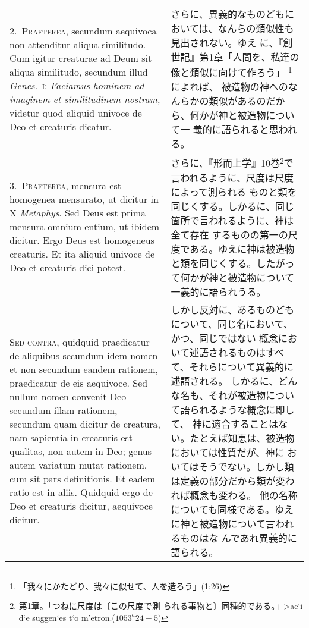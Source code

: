 \documentclass[paper=a4paper,fontsize=10pt,jafontsize=9pt,titlepage]{jlreq}
\begin{document}
\begin{longtable}{p{21em}p{21em}}
\\

2.~{\scshape Praeterea}, secundum aequivoca non attenditur aliqua
similitudo. Cum igitur creaturae ad Deum sit aliqua similitudo,
secundum illud {\itshape Genes}.\ {\scshape i}: {\itshape Faciamus hominem ad
imaginem et similitudinem nostram}, videtur quod aliquid univoce de
Deo et creaturis dicatur.

&

さらに、異義的なものどもにおいては、なんらの類似性も見出されない。ゆえ
に、『創世記』第1章「人間を、私達の像と類似に向けて作ろう」
\footnote{「我々にかたどり、我々に似せて、人を造ろう」(1:26)}によれば、
被造物の神へのなんらかの類似があるのだから、何かが神と被造物について一
義的に語られると思われる。

\\

3.~{\scshape Praeterea}, mensura est homogenea mensurato, ut dicitur in X
{\itshape Metaphys}. Sed Deus est prima mensura omnium entium, ut ibidem
dicitur. Ergo Deus est homogeneus creaturis. Et ita aliquid univoce de
Deo et creaturis dici potest.

&

さらに、『形而上学』10巻\footnote{第1章。「つねに尺度は〔この尺度で測
られる事物と〕同種的である。」\textgreek{>ae`i d`e suggen`es t`o
m'etron.}($1053^{a}24-5$)}で言われるように、尺度は尺度によって測られる
ものと類を同じくする。しかるに、同じ箇所で言われるように、神は全て存在
するものの第一の尺度である。ゆえに神は被造物と類を同じくする。したがっ
て何かが神と被造物について一義的に語られうる。

\\

{\scshape Sed contra}, quidquid praedicatur de aliquibus secundum idem
nomen et non secundum eandem rationem, praedicatur de eis
aequivoce. Sed nullum nomen convenit Deo secundum illam rationem,
secundum quam dicitur de creatura, nam sapientia in creaturis est
qualitas, non autem in Deo; genus autem variatum mutat rationem, cum
sit pars definitionis. Et eadem ratio est in aliis. Quidquid ergo de
Deo et creaturis dicitur, aequivoce dicitur.

&

しかし反対に、あるものどもについて、同じ名において、かつ、同じではない
概念において述語されるものはすべて、それらについて異義的に述語される。
しかるに、どんな名も、それが被造物について語られるような概念に即して、
神に適合することはない。たとえば知恵は、被造物においては性質だが、神に
おいてはそうでない。しかし類は定義の部分だから類が変われば概念も変わる。
他の名称についても同様である。ゆえに神と被造物について言われるものはな
んであれ異義的に語られる。


\end{longtable}
\end{document}

